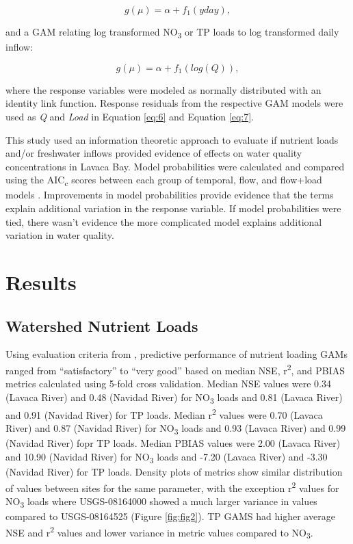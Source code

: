 \documentclass[water,article,submit,oneauthor]{Definitions/mdpi}
\begin{document}
\begin{equation}\label{eq:8}
g(\mu) = \alpha + f_1(yday),
\end{equation}

and a GAM relating log transformed NO\textsubscript{3} or TP loads to
log transformed daily inflow:

\begin{equation}\label{eq:9}
g(\mu) = \alpha + f_1(log(Q)),
\end{equation}

where the response variables were modeled as normally distributed with
an identity link function. Response residuals from the respective GAM
models were used as \emph{Q} and \emph{Load} in Equation \ref{eq:6} and
Equation \ref{eq:7}.

This study used an information theoretic approach to evaluate if
nutrient loads and/or freshwater inflows provided evidence of effects on
water quality concentrations in Lavaca Bay. Model probabilities were
calculated and compared using the AIC\textsubscript{c} scores between
each group of temporal, flow, and flow+load models
\citep{burnhamAICModelSelection2011}. Improvements in model
probabilities provide evidence that the terms explain additional
variation in the response variable. If model probabilities were tied,
there wasn't evidence the more complicated model explains additional
variation in water quality.

\hypertarget{results}{%
\section{Results}\label{results}}

\hypertarget{watershed-nutrient-loads}{%
\subsection{Watershed Nutrient Loads}\label{watershed-nutrient-loads}}

Using evaluation criteria from
\citet{moriasiHydrologicWaterQuality2015}, predictive performance of
nutrient loading GAMs ranged from ``satisfactory'' to ``very good''
based on median NSE, r\textsuperscript{2}, and PBIAS metrics calculated
using 5-fold cross validation. Median NSE values were 0.34 (Lavaca
River) and 0.48 (Navidad River) for NO\textsubscript{3} loads and 0.81
(Lavaca River) and 0.91 (Navidad River) for TP loads. Median
r\textsuperscript{2} values were 0.70 (Lavaca River) and 0.87 (Navidad
River) for NO\textsubscript{3} loads and 0.93 (Lavaca River) and 0.99
(Navidad River) fopr TP loads. Median PBIAS values were 2.00 (Lavaca
River) and 10.90 (Navidad River) for NO\textsubscript{3} loads and -7.20
(Lavaca River) and -3.30 (Navidad River) for TP loads. Density plots of
metrics show similar distribution of values between sites for the same
parameter, with the exception r\textsuperscript{2} values for
NO\textsubscript{3} loads where USGS-08164000 showed a much larger
variance in values compared to USGS-08164525 (Figure \ref{fig:fig2}). TP
GAMS had higher average NSE and r\textsuperscript{2} values and lower
variance in metric values compared to NO\textsubscript{3}.
\end{document}
